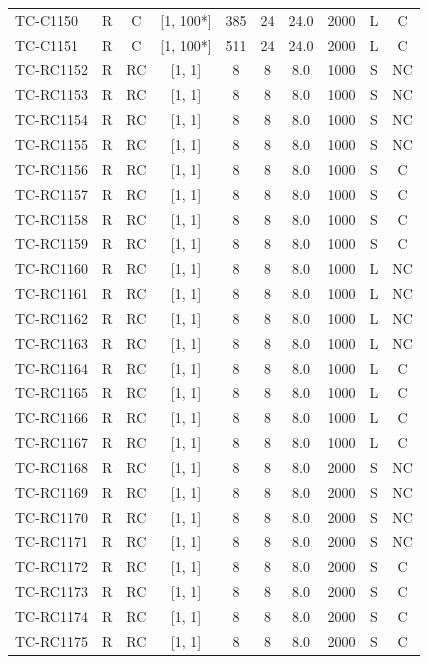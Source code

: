\begin{longtable}{lccccccccc}
TC-C1150 & R & C & [1, 100*] & 385 & 24 & 24.0 & 2000 & L & C \\
TC-C1151 & R & C & [1, 100*] & 511 & 24 & 24.0 & 2000 & L & C \\
TC-RC1152 & R & RC & [1, 1] & 8 & 8 & 8.0 & 1000 & S & NC \\
TC-RC1153 & R & RC & [1, 1] & 8 & 8 & 8.0 & 1000 & S & NC \\
TC-RC1154 & R & RC & [1, 1] & 8 & 8 & 8.0 & 1000 & S & NC \\
TC-RC1155 & R & RC & [1, 1] & 8 & 8 & 8.0 & 1000 & S & NC \\
TC-RC1156 & R & RC & [1, 1] & 8 & 8 & 8.0 & 1000 & S & C \\
TC-RC1157 & R & RC & [1, 1] & 8 & 8 & 8.0 & 1000 & S & C \\
TC-RC1158 & R & RC & [1, 1] & 8 & 8 & 8.0 & 1000 & S & C \\
TC-RC1159 & R & RC & [1, 1] & 8 & 8 & 8.0 & 1000 & S & C \\
TC-RC1160 & R & RC & [1, 1] & 8 & 8 & 8.0 & 1000 & L & NC \\
TC-RC1161 & R & RC & [1, 1] & 8 & 8 & 8.0 & 1000 & L & NC \\
TC-RC1162 & R & RC & [1, 1] & 8 & 8 & 8.0 & 1000 & L & NC \\
TC-RC1163 & R & RC & [1, 1] & 8 & 8 & 8.0 & 1000 & L & NC \\
TC-RC1164 & R & RC & [1, 1] & 8 & 8 & 8.0 & 1000 & L & C \\
TC-RC1165 & R & RC & [1, 1] & 8 & 8 & 8.0 & 1000 & L & C \\
TC-RC1166 & R & RC & [1, 1] & 8 & 8 & 8.0 & 1000 & L & C \\
TC-RC1167 & R & RC & [1, 1] & 8 & 8 & 8.0 & 1000 & L & C \\
TC-RC1168 & R & RC & [1, 1] & 8 & 8 & 8.0 & 2000 & S & NC \\
TC-RC1169 & R & RC & [1, 1] & 8 & 8 & 8.0 & 2000 & S & NC \\
TC-RC1170 & R & RC & [1, 1] & 8 & 8 & 8.0 & 2000 & S & NC \\
TC-RC1171 & R & RC & [1, 1] & 8 & 8 & 8.0 & 2000 & S & NC \\
TC-RC1172 & R & RC & [1, 1] & 8 & 8 & 8.0 & 2000 & S & C \\
TC-RC1173 & R & RC & [1, 1] & 8 & 8 & 8.0 & 2000 & S & C \\
TC-RC1174 & R & RC & [1, 1] & 8 & 8 & 8.0 & 2000 & S & C \\
TC-RC1175 & R & RC & [1, 1] & 8 & 8 & 8.0 & 2000 & S & C \\

\end{longtable}
